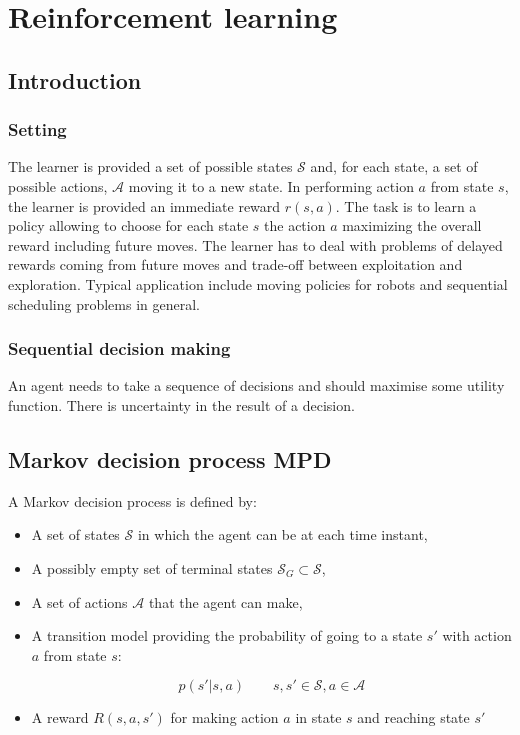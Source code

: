 \chapter{Reinforcement learning}

\section{Introduction}

	\subsection{Setting}
	The learner is provided a set of possible states $\mathcal{S}$ and, for each state, a set of possible actions, $\mathcal{A}$ moving it to a new state.
	In performing action $a$ from state $s$, the learner is provided an immediate reward $r(s,a)$.
	The task is to learn a policy allowing to choose for each state $s$ the action $a$ maximizing the overall reward including future moves.
	The learner has to deal with problems of delayed rewards coming from future moves and trade-off between exploitation and exploration.
	Typical application include moving policies for robots and sequential scheduling problems in general.

	\subsection{Sequential decision making}
	An agent needs to take a sequence of decisions and should maximise some utility function.
	There is uncertainty in the result of a decision.

\section{Markov decision process MPD}
A Markov decision process is defined by:

\begin{itemize}
	\item A set of states $\mathcal{S}$ in which the agent can be at each time instant, 
	\item A possibly empty set of terminal states $\mathcal{S}_G\subset\mathcal{S}$,
	\item A set of actions $\mathcal{A}$ that the agent can make, 
	\item A transition model providing the probability of going to a state $s'$ with action $a$ from state $s$:

		$$p(s'|s,a)\qquad s,s'\in\mathcal{S},a\in\mathcal{A}$$

	\item A reward $R(s,a,s')$ for making action $a$ in state $s$ and reaching state $s'$
\end{itemize}


